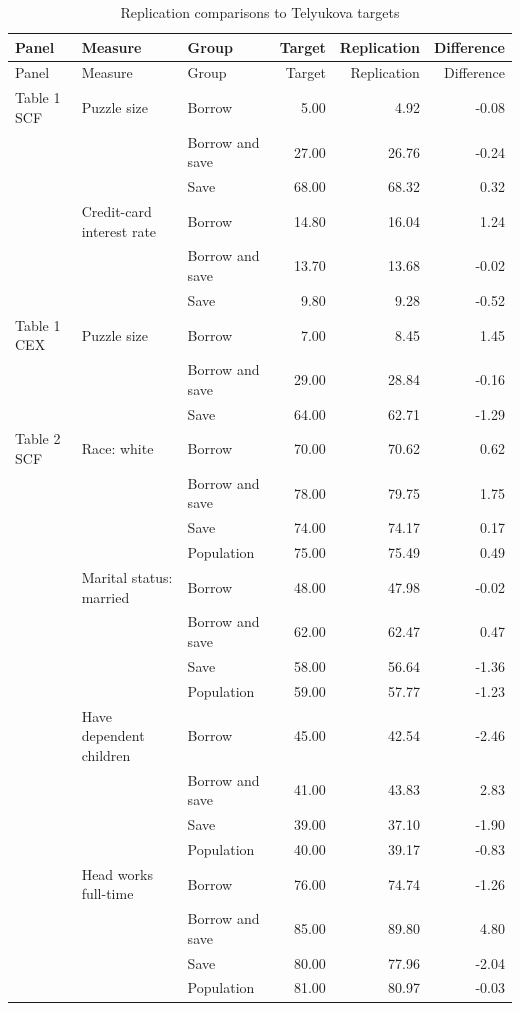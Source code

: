 \begin{longtable}{lllrrr}
\caption{Replication comparisons to Telyukova targets}\label{tab:replication-comparison}\\
\toprule
Panel & Measure & Group & Target & Replication & Difference \\
\midrule
\endfirsthead
\toprule
Panel & Measure & Group & Target & Replication & Difference \\
\midrule
\endhead
Table 1 SCF & Puzzle size & Borrow & 5.00 & 4.92 & -0.08 \\
 &  & Borrow and save & 27.00 & 26.76 & -0.24 \\
 &  & Save & 68.00 & 68.32 & 0.32 \\
 & Credit-card interest rate & Borrow & 14.80 & 16.04 & 1.24 \\
 &  & Borrow and save & 13.70 & 13.68 & -0.02 \\
 &  & Save & 9.80 & 9.28 & -0.52 \\
Table 1 CEX & Puzzle size & Borrow & 7.00 & 8.45 & 1.45 \\
 &  & Borrow and save & 29.00 & 28.84 & -0.16 \\
 &  & Save & 64.00 & 62.71 & -1.29 \\
Table 2 SCF & Race: white & Borrow & 70.00 & 70.62 & 0.62 \\
 &  & Borrow and save & 78.00 & 79.75 & 1.75 \\
 &  & Save & 74.00 & 74.17 & 0.17 \\
 &  & Population & 75.00 & 75.49 & 0.49 \\
 & Marital status: married & Borrow & 48.00 & 47.98 & -0.02 \\
 &  & Borrow and save & 62.00 & 62.47 & 0.47 \\
 &  & Save & 58.00 & 56.64 & -1.36 \\
 &  & Population & 59.00 & 57.77 & -1.23 \\
 & Have dependent children & Borrow & 45.00 & 42.54 & -2.46 \\
 &  & Borrow and save & 41.00 & 43.83 & 2.83 \\
 &  & Save & 39.00 & 37.10 & -1.90 \\
 &  & Population & 40.00 & 39.17 & -0.83 \\
 & Head works full-time & Borrow & 76.00 & 74.74 & -1.26 \\
 &  & Borrow and save & 85.00 & 89.80 & 4.80 \\
 &  & Save & 80.00 & 77.96 & -2.04 \\
 &  & Population & 81.00 & 80.97 & -0.03 \\

\end{longtable}
